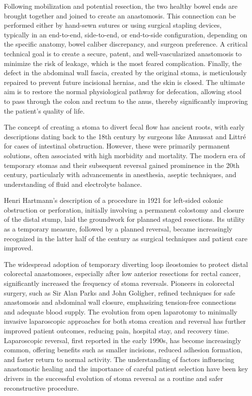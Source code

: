 Following mobilization and potential resection, the two healthy bowel ends are brought together and joined to create an anastomosis. This connection can be performed either by hand-sewn sutures or using surgical stapling devices, typically in an end-to-end, side-to-end, or end-to-side configuration, depending on the specific anatomy, bowel caliber discrepancy, and surgeon preference. A critical technical goal is to create a secure, patent, and well-vascularized anastomosis to minimize the risk of leakage, which is the most feared complication. Finally, the defect in the abdominal wall fascia, created by the original stoma, is meticulously repaired to prevent future incisional hernias, and the skin is closed. The ultimate aim is to restore the normal physiological pathway for defecation, allowing stool to pass through the colon and rectum to the anus, thereby significantly improving the patient's quality of life.

The concept of creating a stoma to divert fecal flow has ancient roots, with early descriptions dating back to the 18th century by surgeons like Amussat and Littr\'{e} for cases of intestinal obstruction. However, these were primarily permanent solutions, often associated with high morbidity and mortality. The modern era of temporary stomas and their subsequent reversal gained prominence in the 20th century, particularly with advancements in anesthesia, aseptic techniques, and understanding of fluid and electrolyte balance. 

Henri Hartmann's description of a procedure in 1921 for left-sided colonic obstruction or perforation, initially involving a permanent colostomy and closure of the distal stump, laid the groundwork for planned staged resections. Its utility as a temporary measure, followed by a planned reversal, became increasingly recognized in the latter half of the century as surgical techniques and patient care improved.

The widespread adoption of temporary diverting loop ileostomies to protect distal colorectal anastomoses, especially after low anterior resections for rectal cancer, significantly increased the frequency of stoma reversals. Pioneers in colorectal surgery, such as Sir Alan Parks and John Goligher, refined techniques for safe anastomosis and abdominal wall closure, emphasizing tension-free connections and adequate blood supply. The evolution from open laparotomy to minimally invasive laparoscopic approaches for both stoma creation and reversal has further improved patient outcomes, reducing pain, hospital stay, and recovery time. Laparoscopic reversal, first reported in the early 1990s, has become increasingly common, offering benefits such as smaller incisions, reduced adhesion formation, and faster return to normal activity. The understanding of factors influencing anastomotic healing and the importance of careful patient selection have been key drivers in the successful evolution of stoma reversal as a routine and safer reconstructive procedure.

